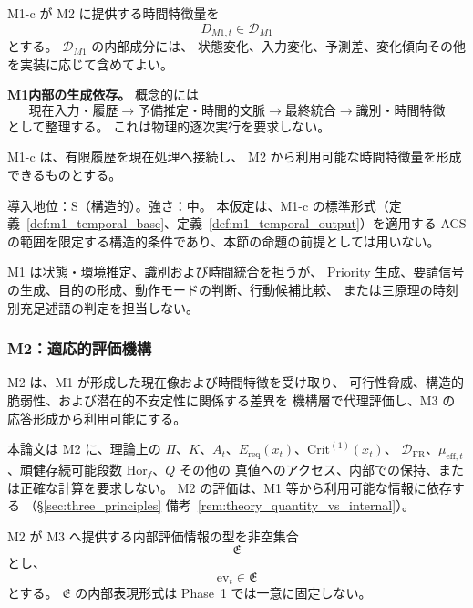 \begin{definition}
\label{def:m1_temporal_output}
M1-c が M2 に提供する時間特徴量を
\[
  D_{M1,t}\in\mathcal D_{M1}
\]
とする。
$\mathcal D_{M1}$ の内部成分には、
状態変化、入力変化、予測差、変化傾向その他を実装に応じて含めてよい。
\end{definition}

\noindent\textbf{M1内部の生成依存。}
概念的には
\[
  \text{現在入力・履歴}
  \longrightarrow
  \text{予備推定・時間的文脈}
  \longrightarrow
  \text{最終統合}
  \longrightarrow
  \text{識別・時間特徴}
\]
として整理する。
これは物理的逐次実行を要求しない。

\begin{assumption}[M1-cの時間統合構造]
\label{ass:m1c_temporal}
M1-c は、有限履歴を現在処理へ接続し、
M2 から利用可能な時間特徴量を形成できるものとする。

導入地位：S（構造的）。強さ：中。
本仮定は、M1-c の標準形式（定義~\ref{def:m1_temporal_base}、定義~\ref{def:m1_temporal_output}）を適用する ACS の範囲を限定する構造的条件であり、本節の命題の前提としては用いない。
\end{assumption}

\begin{remark}[M1の責務境界]
\label{rem:m1_responsibility}
M1 は状態・環境推定、識別および時間統合を担うが、
Priority 生成、要請信号の生成、目的の形成、動作モードの判断、行動候補比較、
または三原理の時刻別充足述語の判定を担当しない。
\end{remark}


\subsubsection{M2：適応的評価機構}
\label{subsec:m2}

M2 は、M1 が形成した現在像および時間特徴を受け取り、
可行性脅威、構造的脆弱性、および潜在的不安定性に関係する差異を
機構層で代理評価し、M3 の応答形成から利用可能にする。

本論文は M2 に、理論上の
$\Pi$、$K$、$A_t$、$E_{\mathrm{req}}(x_t)$、$\mathrm{Crit}^{(1)}(x_t)$、
$\mathcal{D}_{\mathrm{FR}}$、$\mu_{\mathrm{eff},t}$、頑健存続可能段数 $\mathrm{Hor}_f$、$Q$ その他の
真値へのアクセス、内部での保持、または正確な計算を要求しない。
M2 の評価は、M1 等から利用可能な情報に依存する
（\S\ref{sec:three_principles} 備考~\ref{rem:theory_quantity_vs_internal}）。

\begin{definition}
\label{def:m2_eval_space}
M2 が M3 へ提供する内部評価情報の型を非空集合
\[
  \mathfrak E
\]
とし、
\[
  \mathrm{ev}_t\in\mathfrak E
\]
とする。
$\mathfrak E$ の内部表現形式は Phase~1 では一意に固定しない。
\end{definition}

